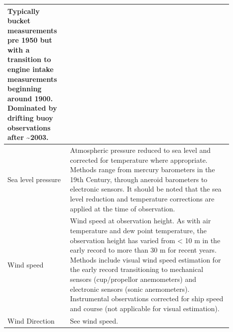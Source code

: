 \begin{table}[h]
\begin{tabular}{|p{0.25\linewidth}|p{0.65\linewidth}|}
Typically bucket measurements pre 1950 but with a transition to engine intake measurements beginning around 1900. Dominated by drifting buoy observations after \sim 2003.\\
\hline
Sea level pressure & Atmospheric pressure reduced to sea level and corrected for temperature where appropriate. Methods range from mercury barometers in the 19th Century, through aneroid barometers to electronic sensors. It should be noted that the sea level reduction and temperature corrections are applied at the time of observation.\\
\hline
Wind speed & Wind speed at observation height. As with air temperature and dew point temperature, the observation height has varied from < 10 m in the early record to more than 30 m for recent years. Methods include visual wind speed estimation for the early record transitioning to mechanical sensors (cup/propellor anemometers) and electronic sensors (sonic anemometers). Instrumental observations corrected for ship speed and course (not applicable for visual estimation).\\
\hline
Wind Direction & See wind speed.\\
\hline
\end{tabular}
\end{table}

